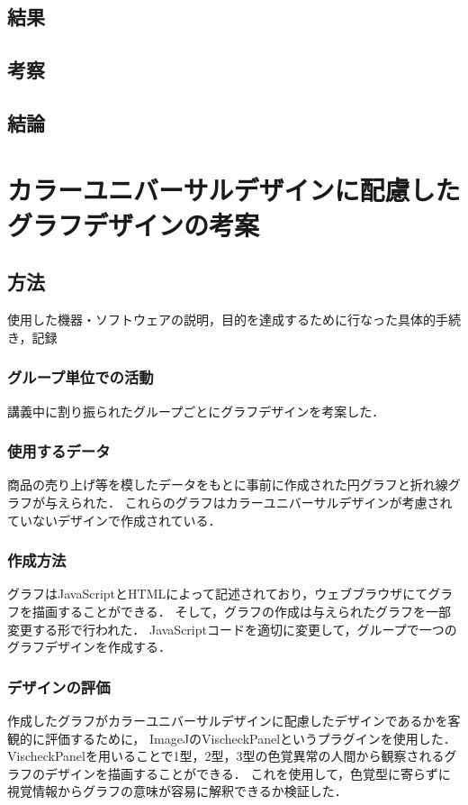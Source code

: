 \documentclass[titlepage]{jlreq}
\begin{document}
\subsection{結果}

\subsection{考察}

\subsection{結論}




\section{カラーユニバーサルデザインに配慮したグラフデザインの考案}

\subsection{方法}
使⽤した機器・ソフトウェアの説明，⽬的を達成するために⾏なった具体的⼿続き，記録


\subsubsection{グループ単位での活動}
講義中に割り振られたグループごとにグラフデザインを考案した．

\subsubsection{使用するデータ}
商品の売り上げ等を模したデータをもとに事前に作成された円グラフと折れ線グラフが与えられた．
これらのグラフはカラーユニバーサルデザインが考慮されていないデザインで作成されている．

\subsubsection{作成方法}
グラフはJavaScriptとHTMLによって記述されており，ウェブブラウザにてグラフを描画することができる．
そして，グラフの作成は与えられたグラフを一部変更する形で行われた．
JavaScriptコードを適切に変更して，グループで一つのグラフデザインを作成する．

\subsubsection{デザインの評価}
作成したグラフがカラーユニバーサルデザインに配慮したデザインであるかを客観的に評価するために，
ImageJのVischeckPanelというプラグインを使用した．
VischeckPanelを用いることで1型，2型，3型の色覚異常の人間から観察されるグラフのデザインを描画することができる．
これを使用して，色覚型に寄らずに視覚情報からグラフの意味が容易に解釈できるか検証した．
\end{document}
